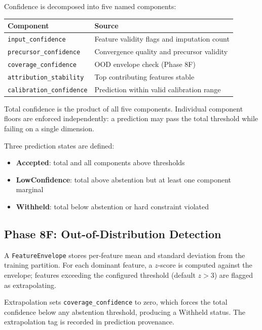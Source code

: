 \documentclass[11pt]{article}
\newcommand{\type}[1]{\texttt{#1}}
\newcommand{\field}[1]{\texttt{#1}}
\begin{document}
Confidence is decomposed into five named components:

\begin{center}
\begin{tabular}{ll}
\textbf{Component} & \textbf{Source} \\
\hline
\field{input\_confidence}       & Feature validity flags and imputation count \\
\field{precursor\_confidence}   & Convergence quality and precursor validity \\
\field{coverage\_confidence}    & OOD envelope check (Phase 8F) \\
\field{attribution\_stability}  & Top contributing features stable \\
\field{calibration\_confidence} & Prediction within valid calibration range \\
\end{tabular}
\end{center}

Total confidence is the product of all five components.  Individual
component floors are enforced independently: a prediction may pass the
total threshold while failing on a single dimension.

Three prediction states are defined:
\begin{itemize}
  \item \textbf{Accepted}: total and all components above thresholds
  \item \textbf{LowConfidence}: total above abstention but at least one
        component marginal
  \item \textbf{Withheld}: total below abstention or hard constraint violated
\end{itemize}

\subsection{Phase 8F: Out-of-Distribution Detection}

A \type{FeatureEnvelope} stores per-feature mean and standard deviation
from the training partition.  For each dominant feature, a $z$-score is
computed against the envelope; features exceeding the configured threshold
(default $z > 3$) are flagged as extrapolating.

Extrapolation sets \field{coverage\_confidence} to zero, which forces the
total confidence below any abstention threshold, producing a Withheld
status.  The extrapolation tag is recorded in prediction provenance.
\end{document}
